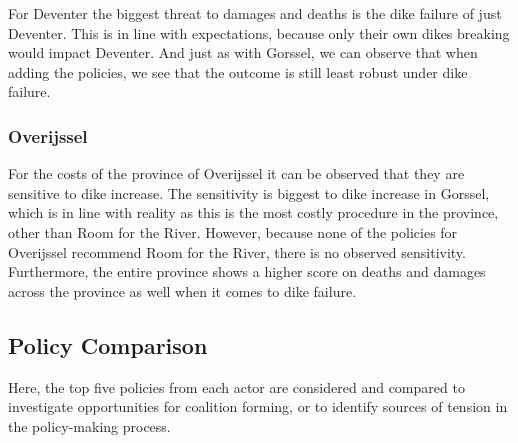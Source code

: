 For Deventer the biggest threat to damages and deaths is the dike failure of just Deventer. This is in line with expectations, because only their own dikes breaking would impact Deventer. And just as with Gorssel, we can observe that when adding the policies, we see that the outcome is still least robust under dike failure. 

\subsubsection{Overijssel}

For the costs of the province of Overijssel it can be observed that they are sensitive to dike increase. The sensitivity is biggest to dike increase in Gorssel, which is in line with reality as this is the most costly procedure in the province, other than Room for the River. However, because none of the policies for Overijssel recommend Room for the River, there is no observed sensitivity. Furthermore, the entire province shows a higher score on deaths and damages across the province as well when it comes to dike failure. 

\subsection{Policy Comparison}
Here, the top five policies from each actor are considered and compared to investigate opportunities for coalition forming, or to identify sources of tension in the policy-making process.
